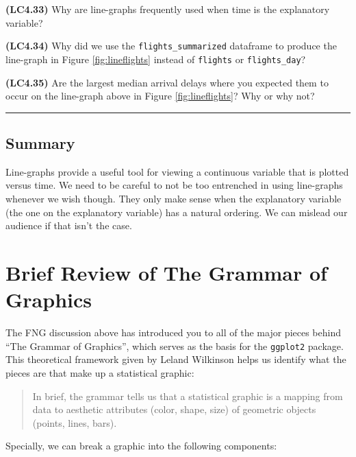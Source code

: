 \documentclass[]{tufte-book}
\let\oldrule=\rule
\renewcommand{\rule}[1]{\oldrule{\linewidth}}
\begin{document}
\textbf{(LC4.33)} Why are line-graphs frequently used when time is the
explanatory variable?

\textbf{(LC4.34)} Why did we use the \texttt{flights\_summarized}
dataframe to produce the line-graph in Figure \ref{fig:lineflights}
instead of \texttt{flights} or \texttt{flights\_day}?

\textbf{(LC4.35)} Are the largest median arrival delays where you
expected them to occur on the line-graph above in Figure
\ref{fig:lineflights}? Why or why not?

\begin{center}\rule{0.5\linewidth}{\linethickness}\end{center}

\subsection{Summary}\label{summary-4}

Line-graphs provide a useful tool for viewing a continuous variable that
is plotted versus time. We need to be careful to not be too entrenched
in using line-graphs whenever we wish though. They only make sense when
the explanatory variable (the one on the explanatory variable) has a
natural ordering. We can mislead our audience if that isn't the case.

\section{Brief Review of The Grammar of
Graphics}\label{brief-review-of-the-grammar-of-graphics}

The FNG discussion above has introduced you to all of the major pieces
behind ``The Grammar of Graphics'', which serves as the basis for the
\texttt{ggplot2} package. This theoretical framework given by Leland
Wilkinson \citep{wilkinson2005} helps us identify what the pieces are
that make up a statistical graphic:

\begin{quote}
In brief, the grammar tells us that a statistical graphic is a mapping
from data to aesthetic attributes (color, shape, size) of geometric
objects (points, lines, bars).
\end{quote}

Specially, we can break a graphic into the following components:
\end{document}

